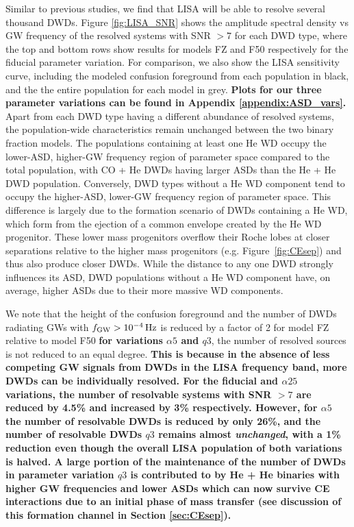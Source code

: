 \documentclass[twocolumn, linenumbers]{aastex631}
\begin{document}
Similar to previous studies, we find that LISA will be able to resolve several thousand DWDs. Figure \ref{fig:LISA_SNR} shows the amplitude spectral density vs GW frequency of the resolved systems with SNR $> 7$ for each DWD type, where the top and bottom rows show results for models FZ and F50 respectively for the fiducial parameter variation. For comparison, we also show the LISA sensitivity curve, including the 
modeled confusion foreground from each population in black, and the the entire population for each model in grey. \textbf{Plots for our three parameter variations can be found in Appendix \ref{appendix:ASD_vars}.} Apart from each DWD type having a different abundance of resolved systems, the population-wide characteristics remain unchanged between the two binary fraction models. The populations containing at least one He WD occupy the lower-ASD, higher-GW frequency region of parameter space compared to the total population, with CO + He DWDs having larger ASDs than the He + He DWD population. Conversely, DWD types without a He WD component tend to occupy the higher-ASD, lower-GW frequency region of parameter space. This difference is largely due to the formation scenario of DWDs containing a He WD, which form from the ejection of a common envelope created by the He WD progenitor. These lower mass progenitors overflow their Roche lobes at closer separations relative to the higher mass progenitors (e.g. Figure~\ref{fig:CEsep}) and thus also produce closer DWDs. While the distance to any one DWD strongly influences its ASD, DWD populations without a He WD component have, on average, higher ASDs due to their more massive WD components.


We note that the height of the confusion foreground and the number of DWDs radiating GWs with $f_{\rm{GW}} > 10^{-4}\,\rm{Hz}$ is reduced by a factor of 2 for model FZ relative to model F50 \textbf{for variations $\alpha5$ and $q3$}, the number of resolved sources is not reduced to an equal degree. \textbf{This is because in the absence of less competing GW signals from DWDs in the LISA frequency band, more DWDs can be individually resolved. For the fiducial and $\alpha25$ variations, the number of resolvable systems with SNR $>7$ are reduced by 4.5\% and increased by 3\% respectively. However, for $\alpha5$ the number of resolvable DWDs is reduced by only 26\%, and the number of resolvable DWDs $q3$ remains almost \emph{unchanged}, with a 1\% reduction even though the overall LISA population of both variations is halved. A large portion of the maintenance of the number of DWDs in parameter variation $q3$ is contributed to by He + He binaries with higher GW frequencies and lower ASDs which can now survive CE interactions due to an initial phase of mass transfer (see discussion of this formation channel in Section \ref{sec:CEsep}).} 
\end{document}
